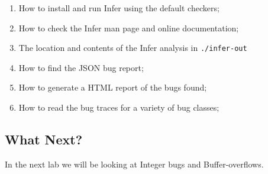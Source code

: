 \begin{enumerate}
	\itemsep0em
	\item How to install and run Infer using the default checkers;
	\item How to check the Infer man page and online documentation;
	\item The location and contents of the Infer analysis in \verb|./infer-out|
	\item How to find the JSON bug report;
	\item How to generate a HTML report of the bugs found;
	\item How to read the bug traces for a variety of bug classes;
\end{enumerate}

\subsection{What Next?}

In the next lab we will be looking at Integer bugs and Buffer-overflows.


